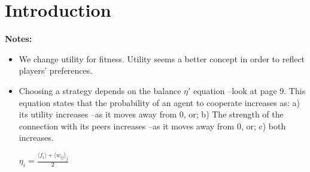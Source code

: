 \documentclass[11pt]{article}
\begin{document}
\section{Introduction}
\label{intro}

\textbf{Notes:}

\begin{itemize}



\item We change utility for fitness. Utility seems a better concept in order to
  reflect players' preferences.  

  

\item Choosing a strategy depends on the balance $\eta'$ equation --look at page
  9. This
  equation states that the probability of an agent to cooperate increases as: a)
  its utility increases --as it moves away from 0, or; b) The strength of the
  connection with its peers increases --as it moves away from 0, or; c) both
  increases.

  $\eta_i = \frac{\langle f_i \rangle + \langle w_{ij} \rangle _j}{2}$\\


\end{itemize}
\end{document}
